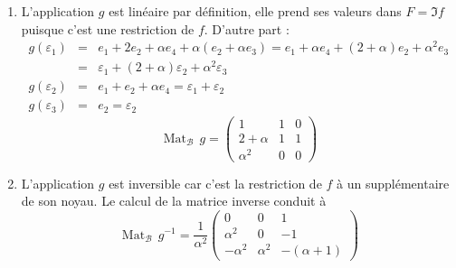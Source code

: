 \begin{enumerate}
\item L'application $g$ est lin\'{e}aire par d\'{e}finition, elle prend ses valeurs dans $F=\Im f$ puisque c'est une restriction de $f$.
D'autre part :
\begin{eqnarray*}
g(\varepsilon _{1})&=&e_{1}+2e_{2}+\alpha e_{4}+\alpha (e_{2}+\alpha
e_{3})=e_{1}+\alpha e_{4}+(2+\alpha )e_{2}+\alpha ^{2}e_{3}\\
&=&\varepsilon_{1}+(2+\alpha )\varepsilon _{2}+\alpha ^{2}\varepsilon _{3}\\
g(\varepsilon _{2})&=&e_{1}+e_{2}+\alpha e_{4}=\varepsilon _{1}+\varepsilon
_{2}\\ 
g(\varepsilon _{3})&=&e_{2}=\varepsilon _{2}
\end{eqnarray*}
\[\mathop{\mathrm{Mat}}_{\mathcal B}\,g  =\left( 
\begin{array}{ccc}
1 & 1 & 0 \\ 
2+\alpha  & 1 & 1 \\ 
\alpha ^{2} & 0 & 0
\end{array}
\right) \]

\item  L'application $g$ est inversible car c'est la restriction de $f$ \`{a} un suppl\'{e}mentaire de son noyau. Le calcul de la matrice inverse
conduit \`{a} 
\begin{displaymath}
\mathop{\mathrm{Mat}}_{\mathcal B}\,g^{-1}=\frac{1}{\alpha ^{2}}\left( 
\begin{array}{ccc}
0 & 0 & 1 \\ 
\alpha ^{2} & 0 & -1 \\ 
-\alpha ^{2} & \alpha ^{2} & -(\alpha +1)
\end{array}
\right)  
\end{displaymath}



\end{enumerate}

